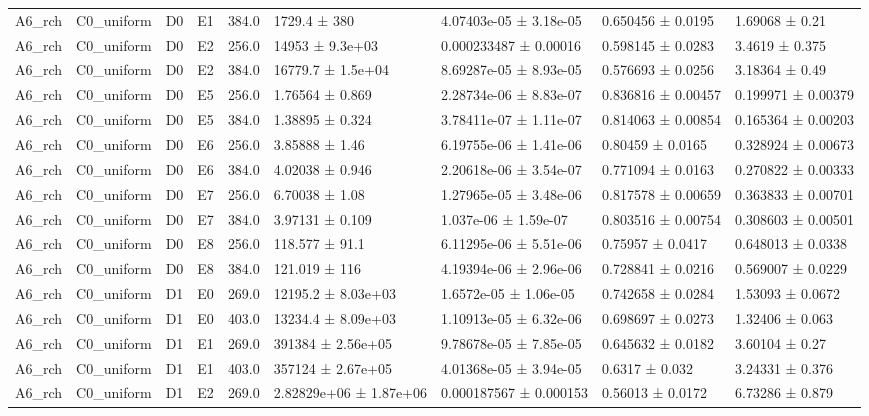 \begin{table}
\begin{tabular}{lllllllll}
A6\_rch & C0\_uniform & D0 & E1 & 384.0 & 1729.4 ± 380 & 4.07403e-05 ± 3.18e-05 & 0.650456 ± 0.0195 & 1.69068 ± 0.21 \\
A6\_rch & C0\_uniform & D0 & E2 & 256.0 & 14953 ± 9.3e+03 & 0.000233487 ± 0.00016 & 0.598145 ± 0.0283 & 3.4619 ± 0.375 \\
A6\_rch & C0\_uniform & D0 & E2 & 384.0 & 16779.7 ± 1.5e+04 & 8.69287e-05 ± 8.93e-05 & 0.576693 ± 0.0256 & 3.18364 ± 0.49 \\
A6\_rch & C0\_uniform & D0 & E5 & 256.0 & 1.76564 ± 0.869 & 2.28734e-06 ± 8.83e-07 & 0.836816 ± 0.00457 & 0.199971 ± 0.00379 \\
A6\_rch & C0\_uniform & D0 & E5 & 384.0 & 1.38895 ± 0.324 & 3.78411e-07 ± 1.11e-07 & 0.814063 ± 0.00854 & 0.165364 ± 0.00203 \\
A6\_rch & C0\_uniform & D0 & E6 & 256.0 & 3.85888 ± 1.46 & 6.19755e-06 ± 1.41e-06 & 0.80459 ± 0.0165 & 0.328924 ± 0.00673 \\
A6\_rch & C0\_uniform & D0 & E6 & 384.0 & 4.02038 ± 0.946 & 2.20618e-06 ± 3.54e-07 & 0.771094 ± 0.0163 & 0.270822 ± 0.00333 \\
A6\_rch & C0\_uniform & D0 & E7 & 256.0 & 6.70038 ± 1.08 & 1.27965e-05 ± 3.48e-06 & 0.817578 ± 0.00659 & 0.363833 ± 0.00701 \\
A6\_rch & C0\_uniform & D0 & E7 & 384.0 & 3.97131 ± 0.109 & 1.037e-06 ± 1.59e-07 & 0.803516 ± 0.00754 & 0.308603 ± 0.00501 \\
A6\_rch & C0\_uniform & D0 & E8 & 256.0 & 118.577 ± 91.1 & 6.11295e-06 ± 5.51e-06 & 0.75957 ± 0.0417 & 0.648013 ± 0.0338 \\
A6\_rch & C0\_uniform & D0 & E8 & 384.0 & 121.019 ± 116 & 4.19394e-06 ± 2.96e-06 & 0.728841 ± 0.0216 & 0.569007 ± 0.0229 \\
A6\_rch & C0\_uniform & D1 & E0 & 269.0 & 12195.2 ± 8.03e+03 & 1.6572e-05 ± 1.06e-05 & 0.742658 ± 0.0284 & 1.53093 ± 0.0672 \\
A6\_rch & C0\_uniform & D1 & E0 & 403.0 & 13234.4 ± 8.09e+03 & 1.10913e-05 ± 6.32e-06 & 0.698697 ± 0.0273 & 1.32406 ± 0.063 \\
A6\_rch & C0\_uniform & D1 & E1 & 269.0 & 391384 ± 2.56e+05 & 9.78678e-05 ± 7.85e-05 & 0.645632 ± 0.0182 & 3.60104 ± 0.27 \\
A6\_rch & C0\_uniform & D1 & E1 & 403.0 & 357124 ± 2.67e+05 & 4.01368e-05 ± 3.94e-05 & 0.6317 ± 0.032 & 3.24331 ± 0.376 \\
A6\_rch & C0\_uniform & D1 & E2 & 269.0 & 2.82829e+06 ± 1.87e+06 & 0.000187567 ± 0.000153 & 0.56013 ± 0.0172 & 6.73286 ± 0.879 \\

\end{tabular}
\end{table}
